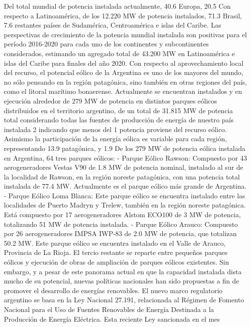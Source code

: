 Del total mundial de potencia instalada actualmente, 40.6%
Europa, 20.5%
Con respecto a Latinoamérica, de los 12.220 MW de potencia instalados, 71.3%
Brasil, 7.6%
restantes países de Sudamérica, Centroamérica e islas del Caribe.
Las perspectivas de crecimiento de la potencia mundial instalada son positivas para el período
2016-2020 para cada uno de los continentes y subcontinentes considerados, estimando un
agregado total de 43.200 MW en Latinoamérica e islas del Caribe para finales del año 2020.
Con respecto al aprovechamiento local del recurso, el potencial eólico de la Argentina es uno
de los mayores del mundo, no sólo pensando en la región patagónica, sino también en otras
regiones del país, como el litoral marítimo bonaerense. Actualmente se encuentran instalados
y en ejecución alrededor de 279 MW de potencia en distintos parques eólicos distribuidos en
el territorio argentino, de un total de 31.815 MW de potencia total considerando todas las
fuentes de producción de energía de nuestro país instalada 2 indicando que menos del 1%
potencia proviene del recurso eólico. Asimismo la participación de la energía eólica es variable
para cada región, representando 13.9%
patagónica, y 1.9%
De los 279 MW de potencia eólica instalada en Argentina, 64%
tres parques eólicos:
- Parque Eólico Rawson: Compuesto por 43 aerogeneradores Vestas V90 de 1.8 MW de
potencia nominal, instalado al sur de la localidad de Rawson, en la región noreste
patagónica, con una potencia total instalada de 77.4 MW. Actualmente es el parque
eólico más grande de Argentina.
- Parque Eólico Loma Blanca: Este parque eólico se encuentra instalado entre las
localidades de Puerto Madryn y Trelew, también en la región noreste patagónica. Está
compuesto por 17 aerogeneradores Alstom ECO100 de 3 MW de potencia, totalizando
51 MW de potencia instalada.
- Parque Eólico Arauco: Compuesto por 26 aerogeneradores IMPSA IWP-83 de 2.0 MW
de potencia, que totalizan 50.2 MW. Este parque eólico se encuentra instalado en el
Valle de Arauco, Provincia de La Rioja.
El tercio restante se reparte entre pequeños parques eólicos y ejecución de obras de
ampliación de parques eólicos existentes.
Sin embargo, y a pesar de este panorama actual en que la capacidad instalada dista mucho de
su potencial, nuevas políticas nacionales han sido propuestas a fin de promover el desarrollo
de energías renovables. El nuevo marco regulatorio argentino se basa en la Ley Nacional
27.191, relacionada al Régimen de Fomento Nacional para el Uso de Fuentes Renovables de
Energía Destinada a la Producción de Energía Eléctrica. Esta reciente Ley sancionada en el mes
